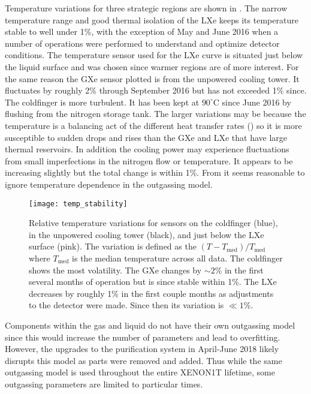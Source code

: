 Temperature variations for three strategic regions are shown in .  The
narrow temperature range and good thermal isolation of the LXe keeps its temperature stable to well under 1\%, with the exception of May
and June 2016 when a number of operations were performed to understand and optimize detector conditions.  The temperature sensor used for
the LXe curve is situated just below the liquid surface and was chosen since warmer regions are of more interest.  For the same reason the
GXe sensor plotted
is from the unpowered cooling tower.  It fluctuates by roughly 2\% through September 2016 but has not exceeded 1\% since.  The 
coldfinger is more turbulent.  It has been kept at $90^{\circ}\mathrm{C}$
since June 2016 by flushing  from the nitrogen storage tank.  The larger variations may be because the temperature is a
balancing act of the
different heat transfer rates () so it is more susceptible to sudden drops and
rises than the GXe and LXe that have large thermal reservoirs.  In addition the cooling power may experience fluctuations from small
imperfections in the nitrogen flow or temperature.  It appears to be increasing slightly but the total change is within
1\%.  From  it seems reasonable to ignore temperature dependence in the outgassing
model.

\begin{figure}
\centering
\texttt{[image: temp\_stability]}
\caption[Relative temperature variations for sensors on the  coldfinger, in the unpowered cooling tower, and just below the LXe
surface.]{Relative temperature variations for sensors on the  coldfinger (blue), in the unpowered cooling
tower (black), and just below the LXe surface (pink).  The variation is defined as the $(T - T_{\mathrm{med}}) / T_{\mathrm{med}}$ where
$T_{\mathrm{med}}$ is the median temperature across all data.  The  coldfinger shows the most volatility.  The GXe changes by
${\sim}2\%$ in the first several months of operation but is since stable within 1\%.  The LXe decreases by roughly 1\% in the first couple
months as adjustments to the detector were made.  Since then its variation is $\ll 1\%$.}
\label{fig:electron_lifetime_model_outgassing_temp_stability}
\end{figure}

Components within the gas and liquid do not have their own outgassing model since this would increase the number of
parameters and lead to overfitting.  However, the upgrades to the purification system in April-June 2018 likely disrupts this model
as parts were removed and added.  Thus while the same outgassing model is used throughout the entire XENON1T lifetime, some outgassing
parameters are limited to particular times.

